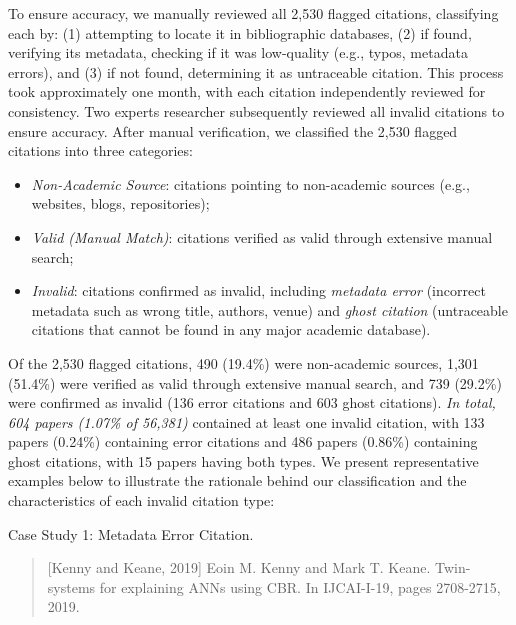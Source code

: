 To ensure accuracy, we manually reviewed all 2,530 flagged citations, classifying each by: (1) attempting to locate it in bibliographic databases, (2) if found, verifying its metadata, checking if it was low-quality (e.g., typos, metadata errors), and (3) if not found, determining it as untraceable citation. 
This process took approximately one month, with each citation independently reviewed for consistency. Two experts researcher subsequently reviewed all invalid citations to ensure accuracy.
After manual verification, we classified the 2,530 flagged citations into three categories:
\begin{itemize}
    \setlength{\itemsep}{0pt}
    \setlength{\topsep}{0pt}
    \setlength{\partopsep}{0pt}
    \setlength{\parsep}{0pt}
    \item \textit{Non-Academic Source}: citations pointing to non-academic sources (e.g., websites, blogs, repositories);
    \item \textit{Valid (Manual Match)}: citations verified as valid through extensive manual search;
    \item \textit{Invalid}: citations confirmed as invalid, including \textit{metadata error} (incorrect metadata such as wrong title, authors, venue) and \textit{ghost citation} (untraceable citations that cannot be found in any major academic database).
\end{itemize}
Of the 2,530 flagged citations, 490 (19.4\%) were non-academic sources, 1,301 (51.4\%) were verified as valid through extensive manual search, and 739 (29.2\%) were confirmed as invalid (136 error citations and 603 ghost citations).
\textit{In total, 604 papers (1.07\% of 56,381)} contained at least one invalid citation, with 133 papers (0.24\%) containing error citations and 486 papers (0.86\%) containing ghost citations, with 15 papers having both types. 
We present representative examples below to illustrate the rationale behind our classification and the characteristics of each invalid citation type:


\begin{casestudybox}{Case Study 1: Metadata Error Citation.}
\begin{quote}
     \small
    [Kenny and Keane, 2019] Eoin M. Kenny and Mark T. Keane. Twin-systems for explaining ANNs using CBR. In IJCAI-I-19, pages 2708-2715, 2019.
\end{quote}
\end{casestudybox}

